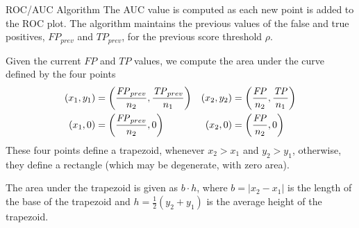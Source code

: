 \begin{frame}{ROC/AUC Algorithm}
The AUC value is computed as each new point is added to the ROC plot.
The algorithm maintains the previous values of the false and true
positives, $\mathit{FP}_{prev}$ and $\mathit{TP}_{prev}$, for the
previous score threshold $\rho$. 

\medskip
Given the current $\mathit{FP}$ and $\mathit{TP}$
values, we compute the area under the curve def\/{i}ned by the four
points
\begin{align*}
(x_1, y_1) & = \left(\frac{\mathit{FP}_{prev}}{n_2}, \frac{\mathit{TP}_{prev}}{n_1}\right) &
(x_2, y_2) & = \left(\frac{\mathit{FP}}{n_2}, \frac{\mathit{TP}}{n_1}\right)\\
(x_1,0) & = \left(\frac{\mathit{FP}_{prev}}{n_2}, 0\right) &
(x_2, 0) &= \left(\frac{\mathit{FP}}{n_2}, 0\right)
\end{align*}
These four points def\/{i}ne a trapezoid, whenever $x_2 > x_1$ and $y_2 >
y_1$, otherwise, they def\/{i}ne a rectangle (which may be degenerate, with
zero area).

\medskip
The area
under the trapezoid is given as $b\cdot h$, where
$b=|x_2-x_1|$ is the length of the base of the trapezoid and $h =
\frac{1}{2}(y_2+y_1)$ is the average height of the trapezoid.
\end{frame}


